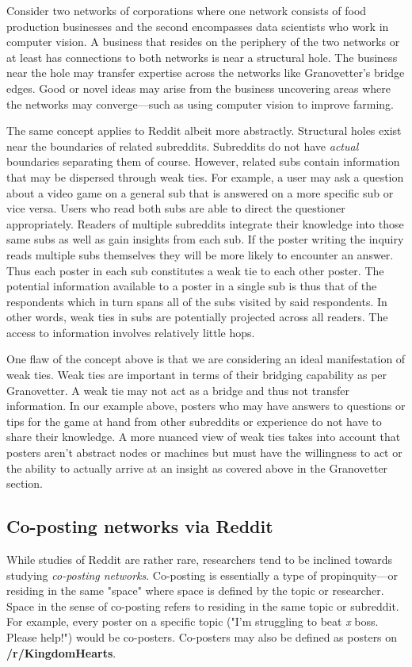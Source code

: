 \documentclass[12pt, a4paper]{article}
\begin{document}
Consider two networks of corporations where one network consists of food production businesses and the second encompasses data scientists who work in computer vision. A business that resides on the periphery of the two networks or at least has connections to both networks is near a structural hole. The business near the hole may transfer expertise across the networks like Granovetter's bridge edges. Good or novel ideas may arise from the business uncovering areas where the networks may converge---such as using computer vision to improve farming.

The same concept applies to Reddit albeit more abstractly. Structural holes exist near the boundaries of related subreddits. Subreddits do not have \textit{actual} boundaries separating them of course. However, related subs contain information that may be dispersed through weak ties. For example, a user may ask a question about a video game on a general sub that is answered on a more specific sub or vice versa. Users who read both subs are able to direct the questioner appropriately. Readers of multiple subreddits integrate their knowledge into those same subs as well as gain insights from each sub. If the poster writing the inquiry reads multiple subs themselves they will be more likely to encounter an answer. Thus each poster in each sub constitutes a weak tie to each other poster. The potential information available to a poster in a single sub is thus that of the respondents which in turn spans all of the subs visited by said respondents. In other words, weak ties in subs are potentially projected across all readers. The access to information involves relatively little hops.

One flaw of the concept above is that we are considering an ideal manifestation of weak ties. Weak ties are important in terms of their bridging capability as per Granovetter. A weak tie may not act as a bridge and thus not transfer information. In our example above, posters who may have answers to questions or tips for the game at hand from other subreddits or experience do not have to share their knowledge. A more nuanced view of weak ties takes into account that posters aren't abstract nodes or machines but must have the willingness to act or the ability to actually arrive at an insight as covered above in the Granovetter section.

\subsection{Co-posting networks via Reddit}
While studies of Reddit are rather rare, researchers tend to be inclined towards studying \textit{co-posting networks}. Co-posting is essentially a type of propinquity---or residing in the same "space" where space is defined by the topic or researcher. Space in the sense of co-posting refers to residing in the same topic or subreddit. For example, every poster on a specific topic ("I'm struggling to beat \textit{x} boss. Please help!") would be co-posters. Co-posters may also be defined as posters on \textbf{/r/KingdomHearts}.
\end{document}
